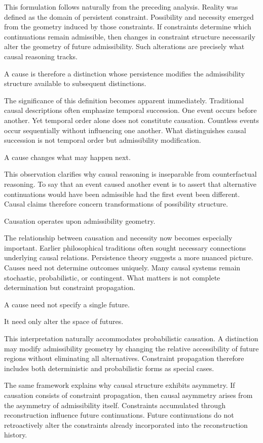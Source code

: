 \documentclass[12pt,oneside]{article}
\theoremstyle{definition}
\begin{document}
This formulation follows naturally from the preceding analysis. Reality was defined as the domain of persistent constraint. Possibility and necessity emerged from the geometry induced by those constraints. If constraints determine which continuations remain admissible, then changes in constraint structure necessarily alter the geometry of future admissibility. Such alterations are precisely what causal reasoning tracks.

A cause is therefore a distinction whose persistence modifies the admissibility structure available to subsequent distinctions.

The significance of this definition becomes apparent immediately. Traditional causal descriptions often emphasize temporal succession. One event occurs before another. Yet temporal order alone does not constitute causation. Countless events occur sequentially without influencing one another. What distinguishes causal succession is not temporal order but admissibility modification.

A cause changes what may happen next.

This observation clarifies why causal reasoning is inseparable from counterfactual reasoning. To say that an event caused another event is to assert that alternative continuations would have been admissible had the first event been different. Causal claims therefore concern transformations of possibility structure.

Causation operates upon admissibility geometry.

The relationship between causation and necessity now becomes especially important. Earlier philosophical traditions often sought necessary connections underlying causal relations. Persistence theory suggests a more nuanced picture. Causes need not determine outcomes uniquely. Many causal systems remain stochastic, probabilistic, or contingent. What matters is not complete determination but constraint propagation.

A cause need not specify a single future.

It need only alter the space of futures.

This interpretation naturally accommodates probabilistic causation. A distinction may modify admissibility geometry by changing the relative accessibility of future regions without eliminating all alternatives. Constraint propagation therefore includes both deterministic and probabilistic forms as special cases.

The same framework explains why causal structure exhibits asymmetry. If causation consists of constraint propagation, then causal asymmetry arises from the asymmetry of admissibility itself. Constraints accumulated through reconstruction influence future continuations. Future continuations do not retroactively alter the constraints already incorporated into the reconstruction history.
\end{document}
